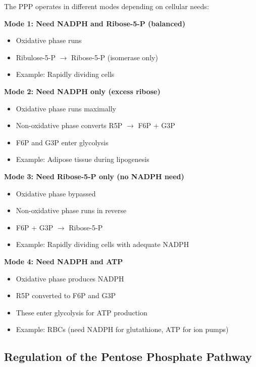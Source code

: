 \begin{theorem}
The PPP operates in different modes depending on cellular needs:

\textbf{Mode 1: Need NADPH and Ribose-5-P (balanced)}
\begin{itemize}
    \item Oxidative phase runs
    \item Ribulose-5-P $\rightarrow$ Ribose-5-P (isomerase only)
    \item Example: Rapidly dividing cells
\end{itemize}

\textbf{Mode 2: Need NADPH only (excess ribose)}
\begin{itemize}
    \item Oxidative phase runs maximally
    \item Non-oxidative phase converts R5P $\rightarrow$ F6P + G3P
    \item F6P and G3P enter glycolysis
    \item Example: Adipose tissue during lipogenesis
\end{itemize}

\textbf{Mode 3: Need Ribose-5-P only (no NADPH need)}
\begin{itemize}
    \item Oxidative phase bypassed
    \item Non-oxidative phase runs in reverse
    \item F6P + G3P $\rightarrow$ Ribose-5-P
    \item Example: Rapidly dividing cells with adequate NADPH
\end{itemize}

\textbf{Mode 4: Need NADPH and ATP}
\begin{itemize}
    \item Oxidative phase produces NADPH
    \item R5P converted to F6P and G3P
    \item These enter glycolysis for ATP production
    \item Example: RBCs (need NADPH for glutathione, ATP for ion pumps)
\end{itemize}
\end{theorem}

\subsection{Regulation of the Pentose Phosphate Pathway}


